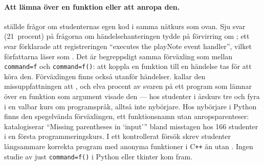 \paragraph{Att lämna över en funktion eller att anropa den.}
\Textcite{Lehtinen2021Struggle} ställde frågor om studenternas egen
kod i samma nätkurs som ovan.  Sju svar (21~procent) på frågorna om
händelsehanteringen tydde på förvirring om
; ett svar förklarade att registreringen
\enquote{executes the playNote event handler}, vilket författarna läser
som .  Det är
begreppsligt samma förväxling som mellan
\texttt{command=f} och \texttt{command=f()}:
att koppla en funktion till en händelse tas för att köra den.
Förväxlingen finns också utanför händelser.  \Textcite{LuKrishnamurthi2024}
kallar den missuppfattningen att
, och elva procent av
svaren på ett program som lämnar över en funktion som argument visade
den --- hos studenter i årskurs tre och fyra i en valbar kurs om
programspråk, alltså inte nybörjare.  Hos nybörjare i Python finns
den spegelvända förväxlingen, ett funktionsnamn utan anropsparenteser:
\textcite[69]{Bosse2021} katalogiserar \enquote{Missing parentheses in
\mbox{\enquote{input}}} bland misstagen hos 166 studenter i en första
programmeringskurs.  I ett kontrollerat försök skrev studenter
långsammare korrekta program med anonyma funktioner i C\texttt{++} än
utan \autocite{Uesbeck2016}.  Ingen studie av just
\texttt{command=f()} i Python eller tkinter kom fram.

